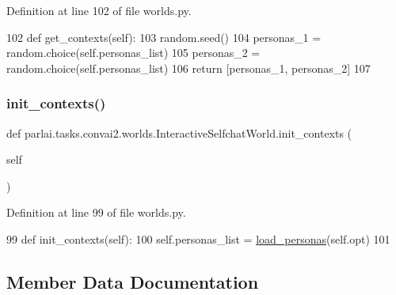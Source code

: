 Definition at line 102 of file worlds.\+py.


\begin{DoxyCode}
102     \textcolor{keyword}{def }get\_contexts(self):
103         random.seed()
104         personas\_1 = random.choice(self.personas\_list)
105         personas\_2 = random.choice(self.personas\_list)
106         \textcolor{keywordflow}{return} [personas\_1, personas\_2]
107 \end{DoxyCode}
\mbox{\label{classparlai_1_1tasks_1_1convai2_1_1worlds_1_1InteractiveSelfchatWorld_af7524303845371d515ac5ee27a650ce8}} 
\subsubsection{\texorpdfstring{init\+\_\+contexts()}{init\_contexts()}}
{\footnotesize\ttfamily def parlai.\+tasks.\+convai2.\+worlds.\+Interactive\+Selfchat\+World.\+init\+\_\+contexts (\begin{DoxyParamCaption}\item[{}]{self }\end{DoxyParamCaption})}



Definition at line 99 of file worlds.\+py.


\begin{DoxyCode}
99     \textcolor{keyword}{def }init\_contexts(self):
100         self.personas\_list = \hyperlink{namespaceparlai_1_1tasks_1_1convai2_1_1worlds_a61a758b7cb43183397d002f7f203f586}{load\_personas}(self.opt)
101 
\end{DoxyCode}


\subsection{Member Data Documentation}
\mbox{\label{classparlai_1_1tasks_1_1convai2_1_1worlds_1_1InteractiveSelfchatWorld_aa750cd45fa90b0d961c23e8d25ac5b4a}} 
